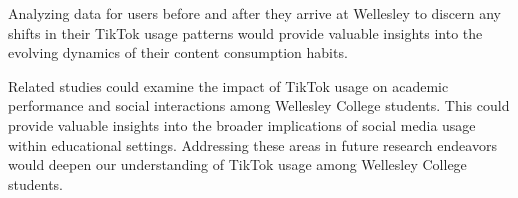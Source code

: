 \documentclass[acmtog]{acmart}
\begin{document}
Analyzing data for users before and after they arrive at Wellesley to discern any shifts in their TikTok usage patterns would provide valuable insights into the evolving dynamics of their content consumption habits. 

Related studies could examine the impact of TikTok usage on academic performance and social interactions among Wellesley College students. This could provide valuable insights into the broader implications of social media usage within educational settings. Addressing these areas in future research endeavors would deepen our understanding of TikTok usage among Wellesley College students.

\printbibliography %
\end{document}
